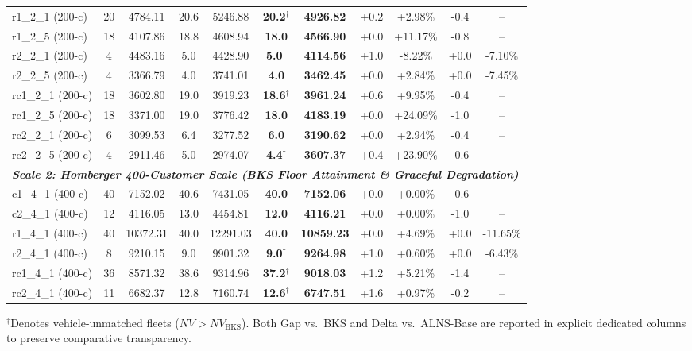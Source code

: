 \begin{table}[!t]
\begin{tabular*}{\textwidth}{@{\extracolsep{\fill}} l cc cc cc cc cc @{}}
r1\_2\_1 (200-c) & 20 & 4784.11 & 20.6 & 5246.88 & \textbf{20.2}$^\dagger$ & \textbf{4926.82} & +0.2 & +2.98\% & -0.4 & -- \\
r1\_2\_5 (200-c) & 18 & 4107.86 & 18.8 & 4608.94 & \textbf{18.0} & \textbf{4566.90} & +0.0 & +11.17\% & -0.8 & -- \\
r2\_2\_1 (200-c) & 4 & 4483.16 & 5.0 & 4428.90 & \textbf{5.0}$^\dagger$ & \textbf{4114.56} & +1.0 & -8.22\% & +0.0 & -7.10\% \\
r2\_2\_5 (200-c) & 4 & 3366.79 & 4.0 & 3741.01 & \textbf{4.0} & \textbf{3462.45} & +0.0 & +2.84\% & +0.0 & -7.45\% \\
rc1\_2\_1 (200-c) & 18 & 3602.80 & 19.0 & 3919.23 & \textbf{18.6}$^\dagger$ & \textbf{3961.24} & +0.6 & +9.95\% & -0.4 & -- \\
rc1\_2\_5 (200-c) & 18 & 3371.00 & 19.0 & 3776.42 & \textbf{18.0} & \textbf{4183.19} & +0.0 & +24.09\% & -1.0 & -- \\
rc2\_2\_1 (200-c) & 6 & 3099.53 & 6.4 & 3277.52 & \textbf{6.0} & \textbf{3190.62} & +0.0 & +2.94\% & -0.4 & -- \\
rc2\_2\_5 (200-c) & 4 & 2911.46 & 5.0 & 2974.07 & \textbf{4.4}$^\dagger$ & \textbf{3607.37} & +0.4 & +23.90\% & -0.6 & -- \\
\midrule
\multicolumn{11}{l}{\textit{\textbf{Scale 2: Homberger 400-Customer Scale (BKS Floor Attainment \& Graceful Degradation)}}} \\
c1\_4\_1 (400-c) & 40 & 7152.02 & 40.6 & 7431.05 & \textbf{40.0} & \textbf{7152.06} & +0.0 & +0.00\% & -0.6 & -- \\
c2\_4\_1 (400-c) & 12 & 4116.05 & 13.0 & 4454.81 & \textbf{12.0} & \textbf{4116.21} & +0.0 & +0.00\% & -1.0 & -- \\
r1\_4\_1 (400-c) & 40 & 10372.31 & 40.0 & 12291.03 & \textbf{40.0} & \textbf{10859.23} & +0.0 & +4.69\% & +0.0 & -11.65\% \\
r2\_4\_1 (400-c) & 8 & 9210.15 & 9.0 & 9901.32 & \textbf{9.0}$^\dagger$ & \textbf{9264.98} & +1.0 & +0.60\% & +0.0 & -6.43\% \\
rc1\_4\_1 (400-c) & 36 & 8571.32 & 38.6 & 9314.96 & \textbf{37.2}$^\dagger$ & \textbf{9018.03} & +1.2 & +5.21\% & -1.4 & -- \\
rc2\_4\_1 (400-c) & 11 & 6682.37 & 12.8 & 7160.74 & \textbf{12.6}$^\dagger$ & \textbf{6747.51} & +1.6 & +0.97\% & -0.2 & -- \\
\bottomrule
\end{tabular*}
{\raggedright \footnotesize $^\dagger$Denotes vehicle-unmatched fleets ($NV > NV_{\text{BKS}}$). Both Gap vs.\ BKS and Delta vs.\ ALNS-Base are reported in explicit dedicated columns to preserve comparative transparency.\par}
\end{table}

